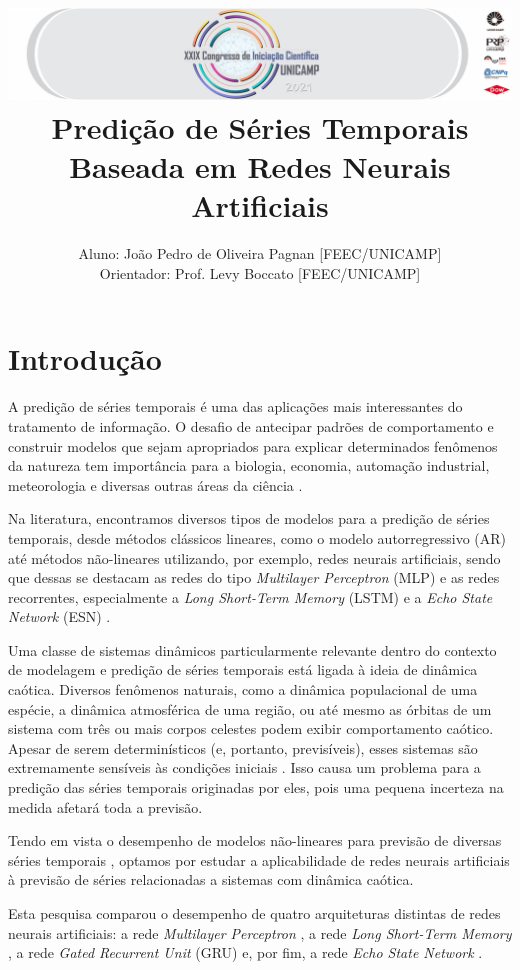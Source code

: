 \documentclass[10pt, technote]{article}
\title{{\noindent \includegraphics[scale = 0.5]{banner-grande.png}}\\ Predição de Séries Temporais Baseada em Redes Neurais
Artificiais}
\author{Aluno: João Pedro de Oliveira Pagnan [FEEC/UNICAMP]\\Orientador: Prof.  Levy Boccato [FEEC/UNICAMP]}
\begin{document}

\section{Introdução}

A predição de séries temporais é uma das aplicações mais interessantes do tratamento de informação. O desafio de antecipar padrões de comportamento e construir modelos que sejam apropriados para explicar determinados fenômenos da natureza tem importância  para a biologia, economia, automação industrial, meteorologia e diversas outras áreas da ciência \cite{box2015time}.

Na literatura, encontramos diversos tipos de modelos para a  predição de séries temporais, desde métodos clássicos lineares, como o modelo autorregressivo (AR) \cite{box2015time} até métodos não-lineares utilizando, por exemplo, redes neurais artificiais, sendo que dessas se destacam as redes do tipo \textit{Multilayer Perceptron} (MLP) \cite{rosenblatt1958perceptron} e as redes recorrentes, especialmente a \textit{Long Short-Term Memory} (LSTM)  \cite{connor1994recurrent} e a \textit{Echo State Network} (ESN) \cite{jaeger2007echo}.

Uma classe de sistemas dinâmicos particularmente relevante dentro do contexto de modelagem e predição de séries temporais está ligada à ideia de dinâmica caótica. Diversos fenômenos naturais, como a dinâmica populacional de uma espécie, a dinâmica atmosférica de uma região, ou até mesmo as órbitas de um sistema com três ou mais corpos celestes podem exibir comportamento caótico. Apesar de serem determinísticos (e, portanto, previsíveis), esses sistemas são extremamente sensíveis às condições iniciais \cite{fiedler1994caos}. Isso causa um problema para a predição das séries temporais originadas por eles, pois uma pequena incerteza na medida afetará toda a previsão. 

Tendo em vista o desempenho de modelos não-lineares para previsão de diversas séries temporais \cite{connor1994recurrent}, optamos por estudar a aplicabilidade de redes neurais artificiais à previsão de séries relacionadas a sistemas com dinâmica caótica.

Esta pesquisa comparou o desempenho de quatro arquiteturas distintas de redes neurais artificiais: a rede \textit{Multilayer Perceptron} \cite{rosenblatt1958perceptron}, a rede \textit{Long Short-Term Memory} \cite{connor1994recurrent}, a rede \textit{Gated Recurrent Unit} (GRU) \cite{cho2014learning} e, por fim, a rede \textit{Echo State Network} \cite{jaeger2007echo}.
\end{document}
